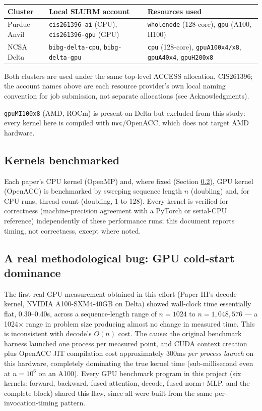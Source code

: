 \documentclass[11pt]{article}
\begin{document}
\begin{center}
\begin{tabular}{@{}p{2.1cm}p{4.3cm}p{8.5cm}@{}}
\toprule
Cluster & Local SLURM account & Resources used \\
\midrule
Purdue Anvil & \texttt{cis261396-ai} (CPU), \texttt{cis261396-gpu} (GPU) & \texttt{wholenode} (128-core), \texttt{gpu} (A100, H100) \\
NCSA Delta & \texttt{bibg-delta-cpu}, \texttt{bibg-delta-gpu} & \texttt{cpu} (128-core), \texttt{gpuA100x4/x8}, \texttt{gpuA40x4}, \texttt{gpuH200x8} \\
\bottomrule
\end{tabular}
\end{center}

Both clusters are used under the same top-level ACCESS allocation,
CIS261396; the account names above are each resource provider's own
local naming convention for job submission, not separate allocations
(see Acknowledgments).

\texttt{gpuMI100x8} (AMD, ROCm) is present on Delta but excluded from
this study: every kernel here is compiled with \texttt{nvc}/OpenACC,
which does not target AMD hardware.

\subsection{Kernels benchmarked}

Each paper's CPU kernel (OpenMP) and, where fixed (Section
\ref{sec:coldstart}), GPU kernel (OpenACC) is benchmarked by sweeping
sequence length $n$ (doubling) and, for CPU runs, thread count
(doubling, 1 to 128). Every kernel is verified for correctness
(machine-precision agreement with a PyTorch or serial-CPU reference)
independently of these performance runs; this document reports timing,
not correctness, except where noted.

\subsection{A real methodological bug: GPU cold-start dominance}
\label{sec:coldstart}

The first real GPU measurement obtained in this effort (Paper III's
decode kernel, NVIDIA A100-SXM4-40GB on Delta) showed wall-clock time
essentially flat, 0.30--0.40s, across a sequence-length range of
$n=1024$ to $n=1{,}048{,}576$ --- a 1024$\times$ range in problem size
producing almost no change in measured time. This is inconsistent with
decode's $O(n)$ cost. The cause: the original benchmark harness
launched one process per measured point, and CUDA context creation
plus OpenACC JIT compilation cost approximately 300ms \emph{per process
launch} on this hardware, completely dominating the true kernel time
(sub-millisecond even at $n=10^6$ on an A100). Every GPU benchmark
program in this project (six kernels: forward, backward, fused
attention, decode, fused norm+MLP, and the complete block) shared this
flaw, since all were built from the same per-invocation-timing pattern.
\end{document}
